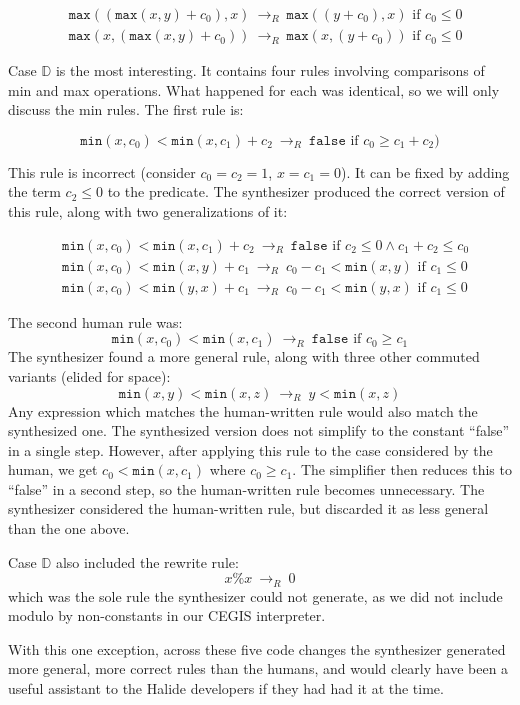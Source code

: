 \documentclass[acmsmall,review]{acmart}\settopmatter{printfolios=true,printccs=false,printacmref=false}
\newcommand{\hmax}[0]{\texttt{max}}
\newcommand{\hmin}[0]{\texttt{min}}
\newcommand{\rewrites}[0]{\:\rightarrow_{R}\:}
\newcommand{\pred}[0]{\textrm{ if }}
\newcommand{\hfalse}[0]{\texttt{false}}
\begin{document}
\begin{align*}
& \hmax((\hmax(x, y) + c_0), x) \rewrites \hmax((y + c_0), x) \pred c_0 \leq 0 \\
& \hmax(x, (\hmax(x, y) + c_0)) \rewrites \hmax(x, (y + c_0)) \pred c_0 \leq 0
\end{align*}

Case $\mathbb{D}$ is the most interesting. It contains four rules involving comparisons of min and max operations. What happened for each was identical, so we will only discuss the min rules. The first rule is:

\[
\hmin(x, c_0) < \hmin(x, c_1) + c_2 \rewrites \hfalse \pred c_0 \geq c_1 + c_2)
\]

This rule is incorrect (consider $c_0 = c_2 = 1$, $x = c_1 = 0$). It can be fixed by adding the term $c_2 \leq 0$ to the predicate. The synthesizer produced the correct version of this rule, along with two generalizations of it:

\begin{align*}
& \hmin(x, c_0) < \hmin(x, c_1) + c_2 \rewrites  \hfalse \pred c_2 \leq 0 \wedge c_1 + c_2 \leq c_0 \\
& \hmin(x, c_0) < \hmin(x, y) + c_1 \rewrites c_0 - c_1 < \hmin(x, y) \pred c_1 \leq 0 \\
& \hmin(x, c_0) < \hmin(y, x) + c_1 \rewrites c_0 - c_1 < \hmin(y, x) \pred c_1 \leq 0
\end{align*}

The second human rule was:
\[
\hmin(x, c_0) < \hmin(x, c_1) \rewrites \hfalse \pred c_0 \geq c_1
\]
The synthesizer found a more general rule, along with three other commuted variants (elided for space):
\[
\hmin(x, y) < \hmin(x, z) \rewrites y < \hmin(x, z)
\]
Any expression which matches the human-written rule would also match the synthesized one. The synthesized version does not simplify to the constant “false” in a single step. However, after applying this rule to the case considered by the human, we get $c_0 < \hmin(x, c_1)$ where $c_0 \geq c_1$. The simplifier then reduces this to “false” in a second step, so the human-written rule becomes unnecessary. The synthesizer considered the human-written rule, but discarded it as less general than the one above.

Case $\mathbb{D}$ also included the rewrite rule: 
\[
x \% x \rewrites 0
\]
which was the sole rule the synthesizer could not generate, as we did not include modulo by non-constants in our CEGIS interpreter.

With this one exception, across these five code changes the synthesizer generated more general, more correct rules than the humans, and would clearly have been a useful assistant to the Halide developers if they had had it at the time.
\end{document}
